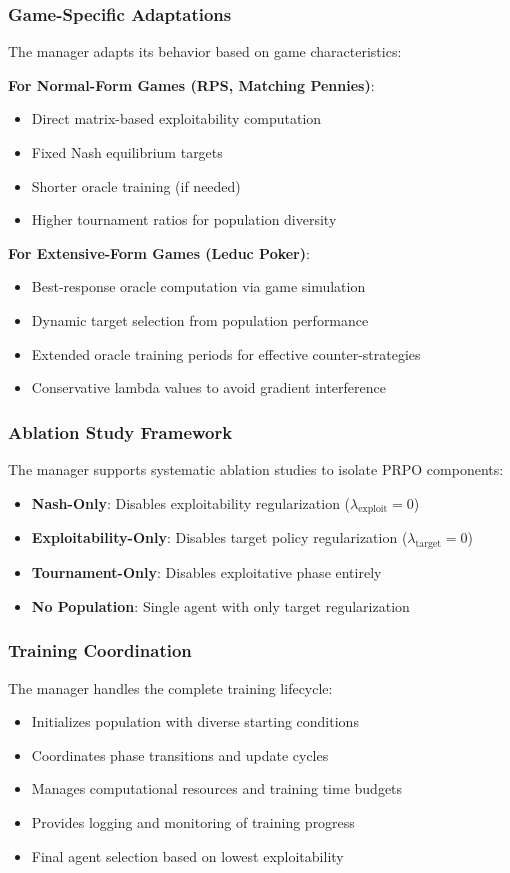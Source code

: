 \documentclass[sigconf,anonymous]{aamas}
\begin{document}
\subsubsection{Game-Specific Adaptations}
The manager adapts its behavior based on game characteristics:

\textbf{For Normal-Form Games (RPS, Matching Pennies)}:
\begin{itemize}
\item Direct matrix-based exploitability computation
\item Fixed Nash equilibrium targets
\item Shorter oracle training (if needed)
\item Higher tournament ratios for population diversity
\end{itemize}

\textbf{For Extensive-Form Games (Leduc Poker)}:
\begin{itemize}
\item Best-response oracle computation via game simulation
\item Dynamic target selection from population performance
\item Extended oracle training periods for effective counter-strategies
\item Conservative lambda values to avoid gradient interference
\end{itemize}

\subsubsection{Ablation Study Framework}
The manager supports systematic ablation studies to isolate PRPO components:
\begin{itemize}
\item \textbf{Nash-Only}: Disables exploitability regularization (\(\lambda_{\text{exploit}} = 0\))
\item \textbf{Exploitability-Only}: Disables target policy regularization (\(\lambda_{\text{target}} = 0\))
\item \textbf{Tournament-Only}: Disables exploitative phase entirely
\item \textbf{No Population}: Single agent with only target regularization
\end{itemize}

\subsubsection{Training Coordination}
The manager handles the complete training lifecycle:
\begin{itemize}
\item Initializes population with diverse starting conditions
\item Coordinates phase transitions and update cycles
\item Manages computational resources and training time budgets
\item Provides logging and monitoring of training progress
\item Final agent selection based on lowest exploitability
\end{itemize}
\end{document}
